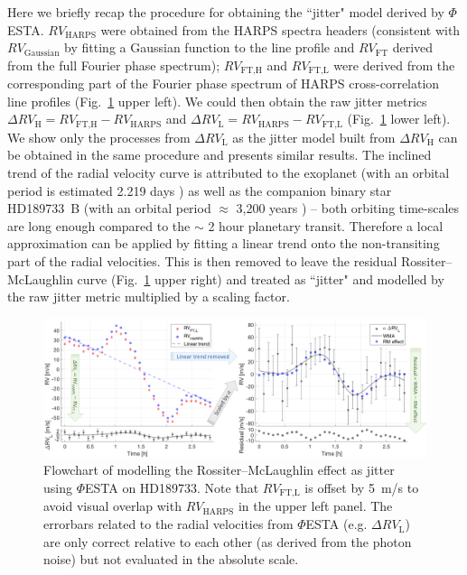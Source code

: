 Here we briefly recap the procedure for obtaining the ``jitter" model derived by $\mathit{\Phi}$ESTA. $RV_\text{HARPS}$ were obtained from the HARPS spectra headers (consistent with $RV_\text{Gaussian}$ by fitting a Gaussian function to the line profile and $RV_\text{FT}$ derived from the full Fourier phase spectrum); $RV_\text{FT,H}$ and $RV_\text{FT,L}$ were derived from the corresponding part of the Fourier phase spectrum of HARPS cross-correlation line profiles (Fig.~\ref{fig:HD189733} upper left). We could then obtain the raw jitter metrics $\Delta RV_\text{H} = RV_\text{FT,H} - RV_\text{HARPS}$ and $\Delta RV_\text{L} = RV_\text{HARPS} - RV_\text{FT,L}$ (Fig.~\ref{fig:HD189733} lower left). We show only the processes from $\Delta RV_\text{L}$ as the jitter model built from $\Delta RV_\text{H}$ can be obtained in the same procedure and presents similar results. The inclined trend of the radial velocity curve is attributed to the exoplanet (with an orbital period is estimated 2.219 days \cite{Bouchy2005ELODIE}) as well as the companion binary star HD189733~B (with an orbital period $\approx$ 3,200 years \cite{Bakos2006}) -- both orbiting time-scales are long enough compared to the $\sim$ 2 hour planetary transit. Therefore a local approximation can be applied by fitting a linear trend onto the non-transiting part of the radial velocities. This is then removed to leave the residual Rossiter–McLaughlin curve (Fig.~\ref{fig:HD189733} upper right) and treated as ``jitter" and modelled by the raw jitter metric multiplied by a scaling factor. 

\begin{figure}[tbp]
\centering
\includegraphics[width = 1.0 \linewidth]
{./Figures/Methods/HD189733.png}
\caption[HD189733: modelling Rossiter–McLaughlin effect as jitter]
		{Flowchart of modelling the Rossiter–McLaughlin effect as jitter using $\mathit{\Phi}$ESTA on HD189733. Note that $RV_\text{FT,L}$ is offset by 5~m/s to avoid visual overlap with $RV_\text{HARPS}$ in the upper left panel. The errorbars related to the radial velocities from $\mathit{\Phi}$ESTA (e.g. $\Delta RV_\text{L}$) are only correct relative to each other (as derived from the photon noise) but not evaluated in the absolute scale.}
\label{fig:HD189733}
\end{figure} 

